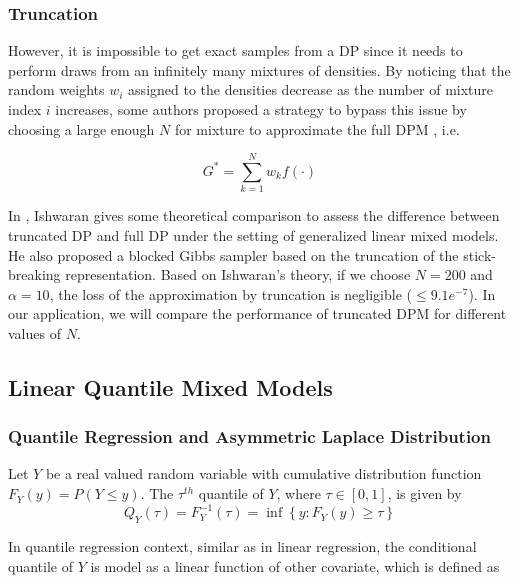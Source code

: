 \documentclass[12pt]{article}
\begin{document}
\subsubsection{Truncation}\label{sec:tru}%
However, it is impossible to get exact samples from a DP since it needs to perform draws from an infinitely many mixtures of densities. By noticing that the random weights $w_i$ assigned to the densities decrease as the number of mixture index $i$ increases, some authors proposed a strategy to bypass this issue by choosing a large enough $N$ for mixture to approximate the full DPM \cite{muliere1998approximating} \cite{ishwaran2001gibbs} \cite{kottas2001bayesian} \cite{ohlssen2007flexible}, i.e.

\begin{equation}\label{eqn:trun}
G^*=\sum_{k=1}^N w_kf(\cdot)
\end{equation}

In \cite{ishwaran2000inference}, Ishwaran gives some theoretical comparison to assess the difference between truncated DP and full DP under the setting of generalized linear mixed models. He also proposed a blocked Gibbs sampler based on the truncation of the stick-breaking representation. Based on Ishwaran's theory, if we choose $N=200$ and $\alpha=10$, the loss of the approximation by truncation is negligible ($\le 9.1e^{-7}$). In our application, we will compare the performance of truncated DPM for different values of $N$.


\subsection{Linear Quantile Mixed Models}\label{sec:QMM}%

\subsubsection{Quantile Regression and Asymmetric Laplace Distribution}\label{sec:QRALD}%

Let $Y$ be a real valued random variable with cumulative distribution function $F_Y(y) = P(Y \le y)$. The $\tau^{th}$ quantile of $Y$, where $\tau\in[0,1]$,  is given by
\begin{equation}\label{eqn:quantile}
Q_{Y}(\tau)=F_{Y}^{-1}(\tau)=\inf\left\{ y:F_{Y}(y)\geq\tau\right\}
\end{equation}

In quantile regression context, similar as in linear regression, the conditional quantile of $Y$ is model as a linear function of other covariate, which is defined as
\end{document}
